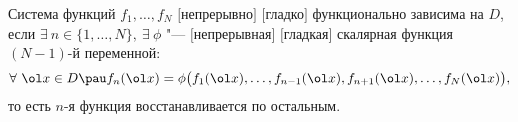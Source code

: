 
Система функций $f_1,\dots,f_N$ $[$непрерывно$]$ $[$гладко$]$ функционально зависима на $D$, если $\exists\ n\in\{1,\ldots,N\},\ \exists\ \phi$ "---
$[$непрерывная$]$ $[$гладкая$]$ скалярная функция $(N-1)$-й переменной$\colon$
\[\forall\ \ol x\in D\pau f_n(\ol x) = \phi\big(f_1(\ol x),\ldots,f_{n-1}(\ol x),f_{n+1}(\ol x),\dots,f_N(\ol x)\big),\]
то есть $n$-я функция восстанавливается по остальным.
